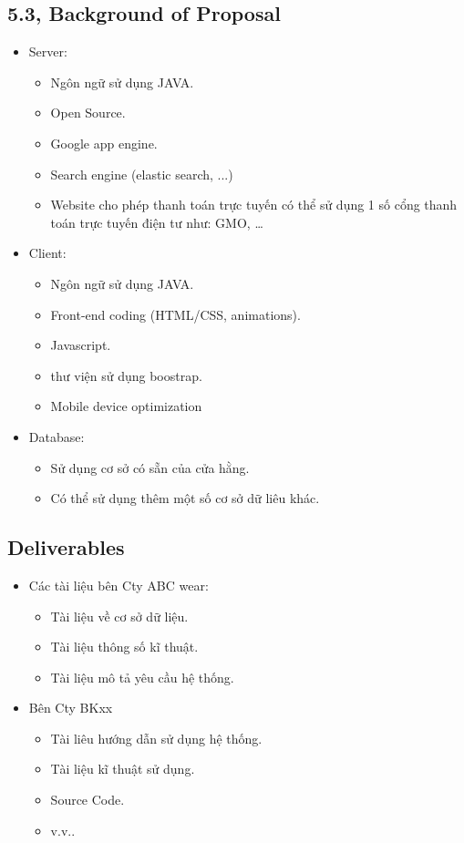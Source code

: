 \documentclass[a4paper,11pt]{report}
\begin{document}
\subsection*{5.3, Background of Proposal}
\begin{itemize}
\item Server:
\begin{itemize}
\item Ngôn ngữ sử dụng JAVA.
\item Open Source.
\item Google app engine.
\item Search engine (elastic search, ...)
\item Website cho phép thanh toán trực tuyến có thể sử dụng 1 số cổng thanh toán trực tuyến điện tư như: GMO, \ldots
\end{itemize}
\item Client:
\begin{itemize}
\item Ngôn ngữ sử dụng JAVA.
\item Front-end coding (HTML/CSS, animations).
\item Javascript.
\item thư viện sử dụng boostrap.
\item Mobile device optimization
\end{itemize}
\item Database:
\begin{itemize}
\item Sử dụng cơ sở có sẵn của cửa hằng.
\item Có thể sử dụng thêm một số cơ sở dữ liêu khác.
\end{itemize}
\end{itemize}
\subsection*{Deliverables}
\begin{itemize}
\item Các tài liệu bên Cty ABC wear:
\begin{itemize}
\item Tài liệu về cơ sở dữ liệu.
\item Tài liệu thông số kĩ thuật.
\item Tài liệu mô tả yêu cầu hệ thống.
\end{itemize}
\item Bên Cty BKxx
\begin{itemize}
\item Tài liêu hướng dẫn sử dụng hệ thống.
\item Tài liệu kĩ thuật sử dụng.
\item Source Code.
\item v.v..
\end{itemize}
\end{itemize}
\end{document}

